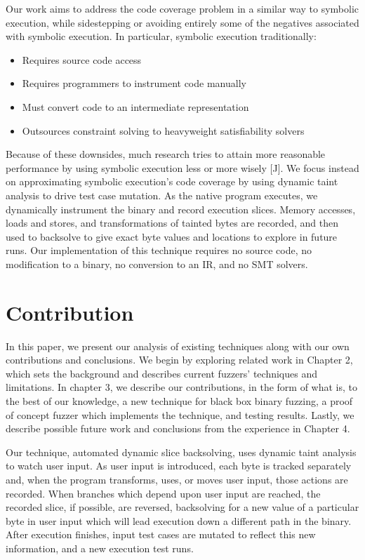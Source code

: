 \documentclass[11pt,expanded,copyright]{fsuthesis}
\begin{document}
Our work aims to address the code coverage problem in a similar way to symbolic execution, while sidestepping or avoiding entirely some of the negatives associated with symbolic execution. In particular, symbolic execution traditionally:

\begin{itemize}
	\item Requires source code access
	\item Requires programmers to instrument code manually
	\item Must convert code to an intermediate representation
	\item Outsources constraint solving to heavyweight satisfiability solvers
\end{itemize}

Because of these downsides, much research tries to attain more reasonable performance by using symbolic execution less or more wisely [J]. We focus instead on approximating symbolic execution's code coverage by using dynamic taint analysis to drive test case mutation. As the native program executes, we dynamically instrument the binary and record execution slices. Memory accesses, loads and stores, and transformations of tainted bytes are recorded, and then used to backsolve to give exact byte values and locations to explore in future runs. Our implementation of this technique requires no source code, no modification to a binary, no conversion to an IR, and no SMT solvers.

\section{Contribution}

In this paper, we present our analysis of existing techniques along with our own contributions and conclusions. We begin by exploring related work in Chapter 2, which sets the background and describes current fuzzers' techniques and limitations. In chapter 3, we describe our contributions, in the form of what is, to the best of our knowledge, a new technique for black box binary fuzzing, a proof of concept fuzzer which implements the technique, and testing results. Lastly, we describe possible future work and conclusions from the experience in Chapter 4.

Our technique, automated dynamic slice backsolving, uses dynamic taint analysis to watch user input. As user input is introduced, each byte is tracked separately and, when the program transforms, uses, or moves user input, those actions are recorded. When branches which depend upon user input are reached, the recorded slice, if possible, are reversed, backsolving for a new value of a particular byte in user input which will lead execution down a different path in the binary. After execution finishes, input test cases are mutated to reflect this new information, and a new execution test runs.
\end{document}
